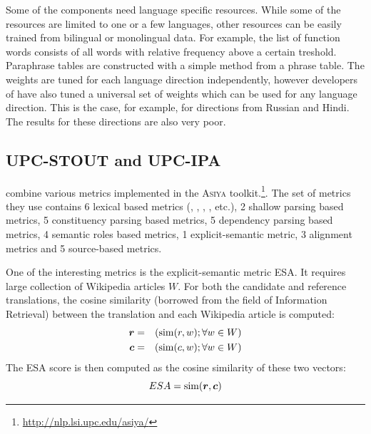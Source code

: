 Some of the  components need language specific resources.
While some of the resources are limited to one or a few languages, other
resources can be easily trained from bilingual or monolingual data. For
example, the list of function words consists of all words with relative
frequency above a certain treshold. Paraphrase tables are constructed with a
simple method from a phrase table. The weights are tuned for each language
direction independently, however developers of  have also tuned
a universal set of weights which can be used for any language direction. This
is the case, for example, for directions from Russian and Hindi. The results
for these directions are also very poor.

\subsection{UPC-STOUT and UPC-IPA}

 combine various metrics implemented in the
\textsc{Asiya} toolkit.\footnote{\url{http://nlp.lsi.upc.edu/asiya/}}. The set
of metrics they use contains 6 lexical based metrics (,
, , , etc.), 2 shallow parsing
based metrics, 5 constituency parsing based metrics, 5 dependency parsing based
metrics, 4 semantic roles based metrics, 1 explicit-semantic metric, 3
alignment metrics and 5 source-based metrics.

One of the interesting metrics is the explicit-semantic metric ESA. It requires
large collection of Wikipedia articles $W$. For both the candidate and
reference translations, the cosine similarity (borrowed from the field of
Information Retrieval) between the translation and each Wikipedia article is
computed:
\begin{eqnarray*}
  \boldsymbol{r} & = & \left(\operatorname{sim}(r,w); \forall w \in W  \right)\\
  \boldsymbol{c} & = & \left(\operatorname{sim}(c,w); \forall w \in W  \right)\\
\end{eqnarray*}
The ESA score is then computed as the cosine similarity of these
two vectors:
\begin{equation*}
  ESA = \operatorname{sim}(\boldsymbol{r}, \boldsymbol{c})
\end{equation*}

